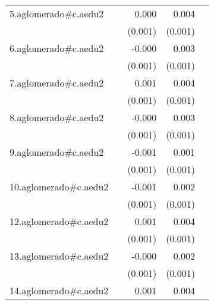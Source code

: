 {\begin{longtable}{l*{4}{D{.}{.}{-1}}}
\addlinespace
5.aglomerado#c.aedu2&                     &       0.000         &       0.004\sym{***}&                     \\
            &                     &     (0.001)         &     (0.001)         &                     \\
\addlinespace
6.aglomerado#c.aedu2&                     &      -0.000         &       0.003\sym{**} &                     \\
            &                     &     (0.001)         &     (0.001)         &                     \\
\addlinespace
7.aglomerado#c.aedu2&                     &       0.001         &       0.004\sym{***}&                     \\
            &                     &     (0.001)         &     (0.001)         &                     \\
\addlinespace
8.aglomerado#c.aedu2&                     &      -0.000         &       0.003\sym{**} &                     \\
            &                     &     (0.001)         &     (0.001)         &                     \\
\addlinespace
9.aglomerado#c.aedu2&                     &      -0.001         &       0.001         &                     \\
            &                     &     (0.001)         &     (0.001)         &                     \\
\addlinespace
10.aglomerado#c.aedu2&                     &      -0.001         &       0.002\sym{**} &                     \\
            &                     &     (0.001)         &     (0.001)         &                     \\
\addlinespace
12.aglomerado#c.aedu2&                     &       0.001         &       0.004\sym{***}&                     \\
            &                     &     (0.001)         &     (0.001)         &                     \\
\addlinespace
13.aglomerado#c.aedu2&                     &      -0.000         &       0.002\sym{***}&                     \\
            &                     &     (0.001)         &     (0.001)         &                     \\
\addlinespace
14.aglomerado#c.aedu2&                     &       0.001         &       0.004\sym{***}&                     \\

\end{longtable}}
